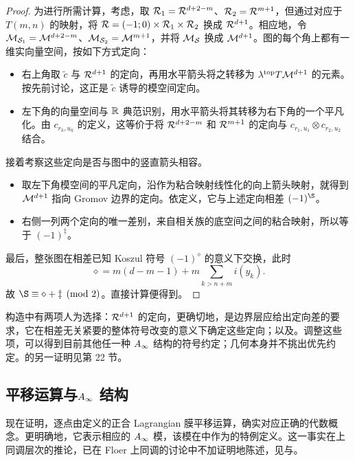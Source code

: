 \begin{proof}
为进行所需计算，考虑，取 $\mathcal R_1=\mathcal R^{d+2-m}$、$\mathcal R_2=\mathcal R^{m+1}$，但通过对应于 $T(m,\allowbreak n)$ 的映射，将 $\mathcal R=(-1;0)\times\mathcal R_1\times\mathcal R_2$ 换成 $\mathcal R^{d+1}$。相应地，令 $\mathcal M_{\mathcal S_1}=\mathcal M^{d+2-m}$、$\mathcal M_{\mathcal S_2}=\mathcal M^{m+1}$，并将 $\mathcal M_{\mathcal S}$ 换成 $\mathcal M^{d+1}$。图的每个角上都有一维实向量空间，按如下方式定向：
\begin{itemize}
\item 右上角取 $\tilde c$ 与 $\mathcal R^{d+1}$ 的定向，再用水平箭头将之转移为 $\lambda^{\mathrm{top}}T\mathcal M^{d+1}$ 的元素。按先前讨论，这正是 $\tilde c$ 诱导的模空间定向。
\item 左下角的向量空间与 $\mathbb R$ 典范识别，用水平箭头将其转移为右下角的一个平凡化。由 $c_{r_k,\allowbreak u_k}$ 的定义，这等价于将 $\mathcal R^{d+2-m}$ 和 $\mathcal R^{m+1}$ 的定向与 $c_{r_1,\allowbreak u_1}\otimes c_{r_2,\allowbreak u_2}$ 结合。
\end{itemize}
接着考察这些定向是否与图中的竖直箭头相容。
\begin{itemize}
\item 取左下角模空间的平凡定向，沿作为粘合映射线性化的向上箭头映射，就得到 $\mathcal M^{d+1}$ 指向 Gromov 边界的定向。依定义，它与上述定向相差 $(-1)^{\S}$。
\item 右侧一列两个定向的唯一差别，来自相关族的底空间之间的粘合映射，所以等于 $(-1)^\ddagger$。
\end{itemize}
最后，整张图在相差已知 Koszul 符号 $(-1)^\diamond$ 的意义下交换，此时
\[
\diamond=m(d-m-1)+m\sum_{k>n+m}i(y_k).
\]
故 $\S\equiv\diamond+\ddagger\pmod2$。直接计算便得到。
\end{proof}
\begin{note}\label{st:12.4}
构造中有两项人为选择：$\mathcal R^{d+1}$ 的定向，更确切地，是边界层应给出定向差的要求，它在相差无关紧要的整体符号改变的意义下确定这些定向；以及。调整这些项，可以得到目前其他任一种 $A_\infty$ 结构的符号约定；几何本身并不挑出优先约定。的另一证明见第 22 节。
\end{note}

\subsection{平移运算与\texorpdfstring{$A_\infty$}{A∞} 结构}\label{sec:12h}
现在证明，逐点由定义的正合 Lagrangian 膜平移运算，确实对应正确的代数概念。更明确地，它表示相应的 $A_\infty$ 模，该模在中作为的特例定义。这一事实在上同调层次的推论，已在 Floer 上同调的讨论中不加证明地陈述，见与。

